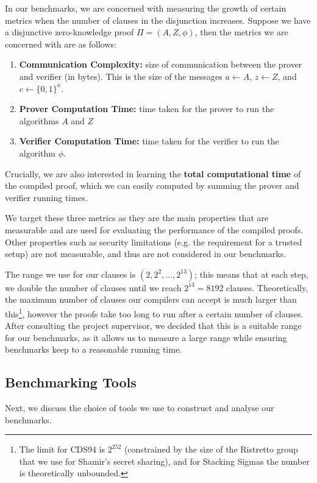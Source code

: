 In our benchmarks, we are concerned with measuring the growth of certain 
metrics when the number of clauses in the disjunction increases. Suppose 
we have a disjunctive zero-knowledge proof $\Pi = (A, Z, \phi)$, then 
the metrics we are concerned with are as follows:
\begin{enumerate}
  \item \textbf{Communication Complexity:} 
  size of communication between the prover and verifier (in bytes). This is 
  the size of the messages $a \leftarrow A$, $z \leftarrow Z$, and $c \leftarrow \{0,1\}^\kappa$.
  \item \textbf{Prover Computation Time:}
  time taken for the prover to run the algorithms $A$ and $Z$ 
  \item \textbf{Verifier Computation Time:}
  time taken for the verifier to run the algorithm $\phi$.
\end{enumerate}

Crucially, we are also interested in learning the \textbf{total computational time} of 
the compiled proof, which we can easily computed by summing the prover and verifier 
running times. 

We target these three metrics as they are the main properties 
that are measurable and are used for evaluating the performance of the compiled 
proofs. Other properties such as security limitations (e.g. the requirement for a
trusted setup) are not measurable, and thus are not considered in our benchmarks.

The range we use for our clauses is $(2, 2^2, \ldots, 2^{13})$; this means that 
at each step, we double the number of clauses until we reach $2^{13} = 8192$ clauses. 
Theoretically, the maximum number of clauses our compilers can accept is much larger than 
this\footnote{The limit for CDS94 is $2^{252}$ (constrained by the size of the Ristretto group 
\cite{ristretto_web} that we use for Shamir's secret sharing), and for Stacking Sigmas the number 
is theoretically unbounded.}, however the proofs take too long to run after a certain number of clauses. 
After consulting the project supervisor, we decided that this is a suitable range for our benchmarks, 
as it allows us to measure a large range while ensuring benchmarks keep to a reasonable running time. 

\subsection{Benchmarking Tools}
Next, we discuss the choice of tools we use to construct and 
analyse our benchmarks.

